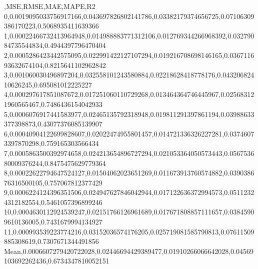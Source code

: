 ,MSE,RMSE,MAE,MAPE,R2
0,0.0019095033756917166,0.043697826802141786,0.03382179374656725,0.07106309386170223,0.5068935411639366
1,0.00022466732413964948,0.014988883771312106,0.012769344266968392,0.03279084735544834,0.4944397796470404
2,0.0005286423442575095,0.022991422127107294,0.019216708698146165,0.036711693632674104,0.8215641102962842
3,0.001060030496897204,0.032558101243580884,0.02218628418778176,0.04320682410626245,0.695081012225227
4,0.000297617851087672,0.017251060110729268,0.013464364746445967,0.025683121960565467,0.7486436154042933
5,0.0006076917441583977,0.02465135792318948,0.019811291397861194,0.03988633377398873,0.43077376085139907
6,0.00040904122699828607,0.02022474955801457,0.014721336326227281,0.03746073397870298,0.759165303566434
7,0.0005863500392974658,0.024213654896727294,0.021053364050573443,0.056753680009376244,0.8475475629779364
8,0.00022622794647524127,0.01504062023651269,0.011673913760574882,0.039038676316500105,0.757067812377429
9,0.0006224124396351506,0.024947627846042944,0.017122636372994573,0.05112324312182554,0.5461057396899246
10,0.0004630112924539247,0.02151766126961689,0.017671808857111657,0.03845909610136005,0.7431679994134927
11,0.000993539223774216,0.03152036574176205,0.025719081585790813,0.07611509885308619,0.7307671344491856
Mean,0.0006607279420722028,0.02446694429389477,0.01910266066642028,0.04569103692262436,0.6734347810052151
